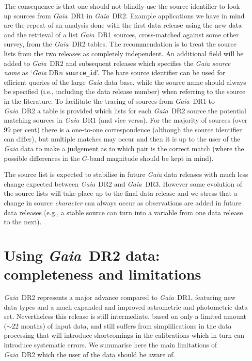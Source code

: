 \documentclass[longauth]{aa_gaia} %
\newcommand\gaia{\textit{Gaia}}
\newcommand\gdr[1]{\gaia~DR#1}
\begin{document}
The consequence is that one should not blindly use the source identifier to look up sources from
\gdr{1} in \gdr{2}. Example applications we have in mind are the repeat of an analysis done with
the first data release using the new data and the retrieval of a list \gdr{1} sources,
cross-matched against some other survey, from the \gdr{2} tables. The recommendation is to treat
the source lists from the two releases as completely independent. An additional field will be added
to \gdr{2} and subsequent releases which specifies the {\gaia} {\em source name} as `{\gaia} DR$n$
\texttt{source\_id}'. The bare source identifier can be used for efficient queries of the large
{\gaia} data base, while the source name should always be specified (i.e., including the data
release number) when referring to the source in the literature. To facilitate the tracing of sources
from \gdr{1} to \gdr{2} a table is provided which lists for each \gdr{2} source the potential
matching sources in \gdr{1} (and vice versa). For the majority of sources (over $99$ per cent)
there is a one-to-one correspondence (although the source identifier can differ), but multiple
matches may occur and then it is up to the user of the {\gaia} data to make a judgement as to which
pair is the correct match (where the possible differences in the $G$-band magnitude should be kept
in mind).

The source list is expected to stabilise in future {\gaia} data releases with much less change
expected between \gdr{2} and {\gaia~DR3}. However some evolution of the source lists will take
place up to the final data release and we stress that a change in source {\em character} can always
occur as observations are added in future data releases (e.g., a stable source can turn into a
variable from one data release to the next).

%
%

\section{Using \gdr{2} data: completeness and limitations}
\label{sec:gdrlimitations}

\gdr{2} represents a major advance compared to \gdr{1}, featuring new data types and a much
expanded and improved astrometric and photometric data set. Nevertheless this release is still
intermediate, based on only a limited amount ($\sim22$ months) of input data, and still suffers
from simplifications in the data processing that will introduce shortcomings in the calibrations
which in turn can introduce systematic errors. We summarise here the main limitations of
\gdr{2} which the user of the data should be aware of.
\end{document}
